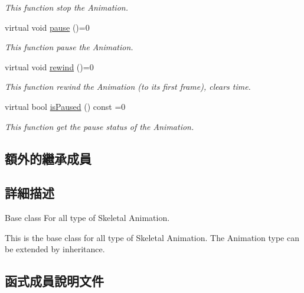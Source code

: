 \begin{DoxyCompactItemize}
\begin{DoxyCompactList}\small\item\em This function stop the Animation. \end{DoxyCompactList}\item 
virtual void \hyperlink{class_magnum_1_1_skeletal_anim_base_aa8c10141024db6b3d1eb58bf8191d1a8}{pause} ()=0
\begin{DoxyCompactList}\small\item\em This function pause the Animation. \end{DoxyCompactList}\item 
virtual void \hyperlink{class_magnum_1_1_skeletal_anim_base_a34ab01c5b1f9e1e1be60a7665c296da0}{rewind} ()=0
\begin{DoxyCompactList}\small\item\em This function rewind the Animation (to its first frame), clears time. \end{DoxyCompactList}\item 
virtual bool \hyperlink{class_magnum_1_1_skeletal_anim_base_a2fb2c9e7bd6a79f326492ef7c5add524}{is\+Paused} () const  =0
\begin{DoxyCompactList}\small\item\em This function get the pause status of the Animation. \end{DoxyCompactList}\end{DoxyCompactItemize}
\subsection*{額外的繼承成員}


\subsection{詳細描述}
Base class For all type of Skeletal Animation. 

This is the base class for all type of Skeletal Animation. The Animation type can be extended by inheritance. 

\subsection{函式成員說明文件}
